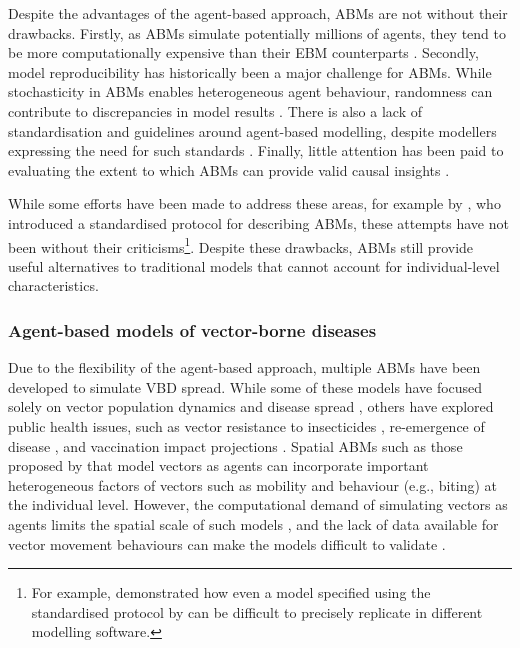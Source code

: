 Despite the advantages of the agent-based approach, ABMs are not without their drawbacks. Firstly, as ABMs simulate potentially millions of agents, they tend to be more computationally expensive than their EBM counterparts \cite{borshchev_system_2004, axtell_agent-based_2022}. Secondly, model reproducibility has historically been a major challenge for ABMs. While stochasticity in ABMs enables heterogeneous agent behaviour, randomness can contribute to discrepancies in model results \cite{fitzpatrick_issues_2019}. There is also a lack of standardisation and guidelines around agent-based modelling, despite modellers expressing the need for such standards \cite{collins_call_2015, janssen_towards_2008}. Finally, little attention has been paid to evaluating the extent to which ABMs can provide valid causal insights \cite{marshall_formalizing_2015}.

While some efforts have been made to address these areas, for example by \citet{grimm_standard_2006}, who introduced a standardised protocol for describing ABMs, these attempts have not been without their criticisms\footnote{For example, \citet{donkin_replicating_2017} demonstrated how even a model specified using the standardised protocol by \citet{grimm_standard_2006} can be difficult to precisely replicate in different modelling software.}. Despite these drawbacks, ABMs still provide useful alternatives to traditional models that cannot account for individual-level characteristics.

\subsubsection{Agent-based models of vector-borne diseases}\label{ch2:abms-vbds}

Due to the flexibility of the agent-based approach, multiple ABMs have been developed to simulate VBD spread. While some of these models have focused solely on vector population dynamics and disease spread \cite{jacintho_agent-based_2010, maneerat_spatial_2016, dommar_agent-based_2014, krzhizhanovskaya_agent-based_2020}, others have explored public health issues, such as vector resistance to insecticides \cite{selvaraj_vector_2020}, re-emergence of disease \cite{linard_multi-agent_2009}, and vaccination impact projections \cite{perkins_agent-based_2019}. Spatial ABMs such as those proposed by \citet{jacintho_agent-based_2010} that model vectors as agents can incorporate important heterogeneous factors of vectors such as mobility and behaviour (e.g., biting) at the individual level. However, the computational demand of simulating vectors as agents limits the spatial scale of such models \cite{manore_network-patch_2015, de_mooij_framework_2023}, and the lack of data available for vector movement behaviours can make the models difficult to validate \cite{jacintho_agent-based_2010, maneerat_spatial_2016}.

